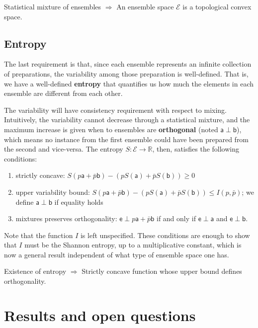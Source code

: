 \documentclass[10pt,twocolumn, nofootinbib]{revtex4-2}
\newcommand{\ens}[1][e] {\mathsf{#1}} %
\newcommand{\Ens}[1][E] {\mathcal{#1}} %
\def\ortho{\perp}
\begin{document}
\begin{tcolorbox}[colback=white, colframe=black]
	Statistical mixture of ensembles $\Rightarrow$ An ensemble space $\Ens$ is a topological convex space.
\end{tcolorbox}

\subsection{Entropy}
The last requirement is that, since each ensemble represents an infinite collection of preparations, the variability among those preparation is well-defined. That is, we have a well-defined \textbf{entropy} that quantifies us how much the elements in each ensemble are different from each other. 

The variability will have consistency requirement with respect to mixing. Intuitively, the variability cannot decrease through a statistical mixture, and the maximum increase is given when to ensembles are \textbf{orthogonal} (noted $\ens[a] \ortho \ens[b]$), which means no instance from the first ensemble could have been prepared from the second and vice-versa. The entropy $S : \Ens \to \mathbb{R}$, then, satisfies the following conditions:
\begin{enumerate}
	\item strictly concave: $S(p \ens[a] + \bar{p} \ens[b]) - (p S(\ens[a]) + \bar{p} S(\ens[b]) ) \geq 0$
	\item upper variability bound: $S(p \ens[a] + \bar{p} \ens[b]) - (p S(\ens[a]) + \bar{p} S(\ens[b]) ) \leq I(p,\bar{p})$; we define $\ens[a] \ortho \ens[b]$ if equality holds
	\item mixtures preserves orthogonality: $\ens \ortho p \ens[a] + \bar{p} \ens[b]$ if and only if $\ens \ortho \ens[a]$ and $\ens \ortho \ens[b]$.
\end{enumerate}
Note that the function $I$ is left unspecified. These conditions are enough to show that $I$ must be the Shannon entropy, up to a multiplicative constant, which is now a general result independent of what type of ensemble space one has.

\begin{tcolorbox}[colback=white, colframe=black]
	Existence of entropy $\Rightarrow$ Strictly concave function whose upper bound defines orthogonality.
\end{tcolorbox}

\section{Results and open questions}
\end{document}
